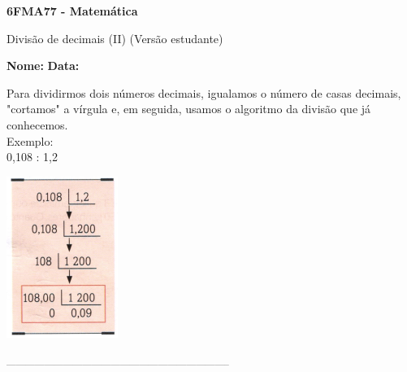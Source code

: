 \documentclass[a4paper,14pt]{article}
\begin{document}
	
	\noindent\textbf{6FMA77 - Matemática} 
	
	\begin{center}Divisão de decimais (II) (Versão estudante)
	\end{center}
	
	\noindent\textbf{Nome:} \underline{\hspace{10cm}}
	\noindent\textbf{Data:} \underline{\hspace{4cm}}
	
	
	\begin{multicols}{2}
		\noindent Para dividirmos dois números decimais, igualamos o número de casas decimais, "cortamos" a vírgula e, em seguida, usamos o algoritmo da divisão que já conhecemos. \\
		Exemplo: \\
		0,108 : 1,2 \\
		\begin{center}
		\includegraphics[width=0.7\linewidth]{6FMA77_imagens/imagem1}
		\end{center}
		\noindent\textsubscript{-----------------------------------------------------------------------}

\end{multicols}
\end{document}
